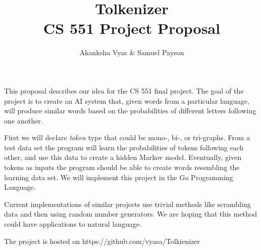 \documentclass[12pt]{article}
\title{Tolkenizer \\ \small{CS 551 Project Proposal}}
\author{Akanksha Vyas \& Samuel Payson}
\begin{document}
\maketitle

This proposal describes our idea for the CS 551 final project. The goal of the
project is to create an AI system that, given words from a particular language,
will produce similar words based on the probabilities of different letters
following one another.

First we will declare \textit{token} type that could be mono-, bi-, or tri-graphs.
From a test data set the program will learn the probabilities of tokens following 
each other, and use this data to create a hidden Markov model.
Eventually, given tokens as inputs the program should be able to create words 
resembling the learning data set. We will implement this project in the Go 
Programming Language.

Current implementations of similar projects use trivial methods like scrambling
data and then using random number generators. We are hoping that this method 
could have applications to natural language.

The project is hosted on https://github.com/vyasa/Tolkienizer
\end{document}
